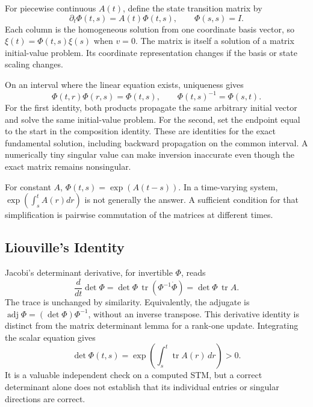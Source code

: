 For piecewise continuous $A(t)$, define the state transition matrix by
\begin{equation}
\partial_t\Phi(t,s)=A(t)\Phi(t,s),\qquad\Phi(s,s)=I.
\label{eq:ch2:stm-ode}
\end{equation}
Each column is the homogeneous solution from one coordinate basis vector, so $\xi(t)=\Phi(t,s)\xi(s)$ when $v=0$. The matrix is itself a solution of a matrix initial-value problem. Its coordinate representation changes if the basis or state scaling changes.

On an interval where the linear equation exists, uniqueness gives
\begin{equation}
\Phi(t,r)\Phi(r,s)=\Phi(t,s),
\qquad \Phi(t,s)^{-1}=\Phi(s,t).
\label{eq:ch2:semigroup}
\end{equation}
For the first identity, both products propagate the same arbitrary initial vector and solve the same initial-value problem. For the second, set the endpoint equal to the start in the composition identity. These are identities for the exact fundamental solution, including backward propagation on the common interval. A numerically tiny singular value can make inversion inaccurate even though the exact matrix remains nonsingular.

For constant $A$, $\Phi(t,s)=\exp(A(t-s))$. In a time-varying system, $\exp(\int_s^t A(r)dr)$ is not generally the answer. A sufficient condition for that simplification is pairwise commutation of the matrices at different times.

\subsection{Liouville's Identity}

Jacobi's determinant derivative, for invertible $\Phi$, reads
\begin{equation}
\frac{d}{dt}\det\Phi=\det\Phi\,\operatorname{tr}(\Phi^{-1}\dot\Phi)
=\det\Phi\,\operatorname{tr}A.
\end{equation}
The trace is unchanged by similarity. Equivalently, the adjugate is $\operatorname{adj}\Phi=(\det\Phi)\Phi^{-1}$, without an inverse transpose. This derivative identity is distinct from the matrix determinant lemma for a rank-one update. Integrating the scalar equation gives
\begin{equation}
\det\Phi(t,s)=\exp\left(\int_s^t\operatorname{tr}A(r)\,dr\right)>0.
\label{eq:ch2:liouville}
\end{equation}
It is a valuable independent check on a computed STM, but a correct determinant alone does not establish that its individual entries or singular directions are correct.


